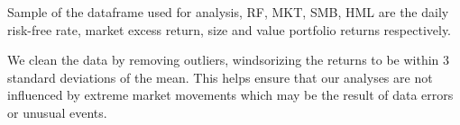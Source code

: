 \begin{table}[ht]
    \centering
    \vspace{1em}
    
    \caption{Sample of the dataframe used for analysis, RF, MKT, SMB, HML are the daily risk-free rate, market excess return, size and value portfolio returns respectively.}
    \vspace{1em}
\end{table}

We clean the data by removing outliers, windsorizing the returns to be within 3 standard deviations of the mean. This helps ensure that our analyses are not influenced by extreme market movements which may be the result of data errors or unusual events.